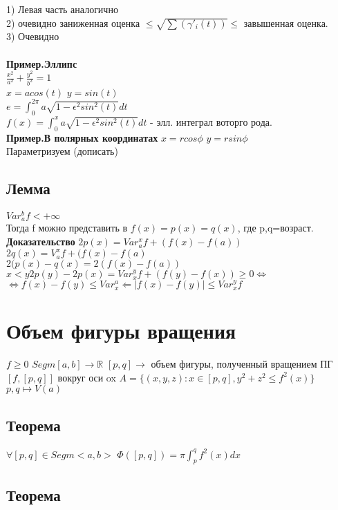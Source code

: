\documentclass[12pt, a4paper]{article}
\newcommand{\nl}{\newline}
\begin{document}
 1) Левая часть аналогично\\
 2) очевидно  заниженная оценка $\leq \sqrt{\sum(\gamma'_i(t))}\leq$ завышенная оценка.\\
 3) Очевидно\\
 \\
 \textbf{Пример.Эллипс}\\
    $\frac{x^2}{a^2}+\frac{y^2}{b^2}=1$\\
    $x= a cos(t)$  $y=sin(t)$ \\
    $e=\int_{0}^{2\pi}a\sqrt{1-\epsilon^2 sin^2(t)}dt$\\
    $f(x)=\int_{0}^{x}a\sqrt{1-\epsilon^2 sin^2(t)}dt$ - элл. интеграл воторго рода.\\
    \textbf{Пример.В полярных координатах} \nl
    $x=rcos\phi$  $y=rsin\phi$\\
    Параметризуем (дописать)
 \subsection{Лемма}
    $Var_{a}^{b} f < +\infty$\\
    Тогда f можно представить в  $f(x)=p(x)=q(x)$, где  p,q=возраст.\\
 \textbf{Доказательство}\nl
    $2 p(x)= Var_{a}^{x}f +(f(x)-f(a))$\\
    $2 q(x)= V_{a}^{x}f +(f(x)-f(a)$\\
    $2(p(x)-q(x) =2(f(x)-f(a))$\\
    $x < y 2p(y)-2p(x) = Var_{x}^{y}f+(f(y)-f(x))\geq0\Longleftrightarrow$\\
   $\Longleftrightarrow f(x) - f(y)\leq Var_{x}^{a} \Leftarrow |f(x)-f(y)|\leq  Var_{x}^{y}f$  
   
   \cfoot{}

\section{Объем фигуры вращения} 
$f\geq 0 $\nl
$Segm[a,b] \rightarrow \mathbb{R}$ \nl
$ [p, q]\rightarrow$ объем  фигуры,  полученный вращением ПГ$ [f,[p,q]] $ вокруг оси ox \nl
$ A= \{(x,y,z): x \in [p,q] , y^2+z^2 \leq f^2(x) \}$ \nl
$ p,q \mapsto V(a)$ \nl
\subsection{Теорема}
	$ \forall [p,q] \in Segm<a, b> $ \nl
	$ \Phi([p, q ]) = \pi \int_p^q f^2(x)dx $
\subsection{Теорема}
  
\end{document}
